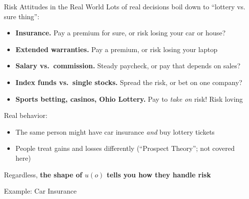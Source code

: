 \begin{frame}{Risk Attitudes in the Real World}
Lots of real decisions boil down to ``lottery vs. sure thing'':
\bsk
\begin{itemize}
    \item \textbf{Insurance.} Pay a premium for sure, or risk losing your car or house?
    \item \textbf{Extended warranties.} Pay a premium, or risk losing your laptop
    \item \textbf{Salary vs.\ commission.} Steady paycheck, or pay that depends on sales?
    \item \textbf{Index funds vs.\ single stocks.} Spread the risk, or bet on one company?
    \item \textbf{Sports betting, casinos, Ohio Lottery.} Pay to \textit{take on} risk! Risk loving
\end{itemize}
\bsk
Real behavior:
\begin{itemize}
    \item The same person might have car insurance \textit{and} buy lottery tickets
    \item People treat gains and losses differently (``Prospect Theory''; not covered here)
\end{itemize}
\vfill
Regardless, \textbf{the shape of $u(o)$ tells you how they handle risk}
\vspace{-0.3in}
\end{frame}


\begin{frame}[standout]
Example: Car Insurance
\end{frame}

